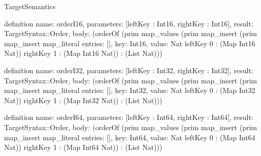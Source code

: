 \begin{lexlean}{TargetSemantics}
\begin{semanticmodule}
definition{
  name: orderI16,
  parameters: [leftKey : Int16, rightKey : Int16],
  result: TargetSyntax::Order,
  body: (orderOf (prim map_values (prim map_insert (prim map_insert map_literal{
    entries: [],
    key: Int16,
    value: Nat
  } leftKey 0 : (Map Int16 Nat)) rightKey 1 : (Map Int16 Nat)) : (List Nat)))
}

definition{
  name: orderI32,
  parameters: [leftKey : Int32, rightKey : Int32],
  result: TargetSyntax::Order,
  body: (orderOf (prim map_values (prim map_insert (prim map_insert map_literal{
    entries: [],
    key: Int32,
    value: Nat
  } leftKey 0 : (Map Int32 Nat)) rightKey 1 : (Map Int32 Nat)) : (List Nat)))
}

definition{
  name: orderI64,
  parameters: [leftKey : Int64, rightKey : Int64],
  result: TargetSyntax::Order,
  body: (orderOf (prim map_values (prim map_insert (prim map_insert map_literal{
    entries: [],
    key: Int64,
    value: Nat
  } leftKey 0 : (Map Int64 Nat)) rightKey 1 : (Map Int64 Nat)) : (List Nat)))
}


\end{semanticmodule}
\end{lexlean}
